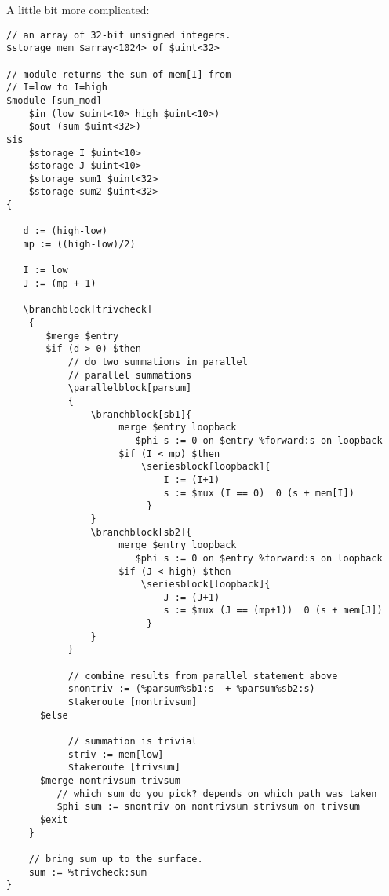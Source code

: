 \documentclass{article}
\begin{document}
A little bit more complicated:
\begin{verbatim}
// an array of 32-bit unsigned integers.
$storage mem $array<1024> of $uint<32> 

// module returns the sum of mem[I] from
// I=low to I=high
$module [sum_mod]
    $in (low $uint<10> high $uint<10>)
    $out (sum $uint<32>)
$is
    $storage I $uint<10>
    $storage J $uint<10>
    $storage sum1 $uint<32>
    $storage sum2 $uint<32>
{
 
   d := (high-low)  
   mp := ((high-low)/2)

   I := low
   J := (mp + 1)

   \branchblock[trivcheck]
    {
       $merge $entry
       $if (d > 0) $then
           // do two summations in parallel
           // parallel summations
           \parallelblock[parsum]
           {
               \branchblock[sb1]{
                    merge $entry loopback
                       $phi s := 0 on $entry %forward:s on loopback
                    $if (I < mp) $then
                        \seriesblock[loopback]{
                            I := (I+1)
                            s := $mux (I == 0)  0 (s + mem[I])
                         }
               } 
               \branchblock[sb2]{
                    merge $entry loopback
                       $phi s := 0 on $entry %forward:s on loopback
                    $if (J < high) $then
                        \seriesblock[loopback]{
                            J := (J+1)
                            s := $mux (J == (mp+1))  0 (s + mem[J])
                         }
               } 
           }
 
           // combine results from parallel statement above
           snontriv := (%parsum%sb1:s  + %parsum%sb2:s)
           $takeroute [nontrivsum]
      $else

           // summation is trivial 
           striv := mem[low]
           $takeroute [trivsum]
      $merge nontrivsum trivsum
         // which sum do you pick? depends on which path was taken
         $phi sum := snontriv on nontrivsum strivsum on trivsum
      $exit
    }

    // bring sum up to the surface.
    sum := %trivcheck:sum
}
\end{verbatim}
\end{document}
